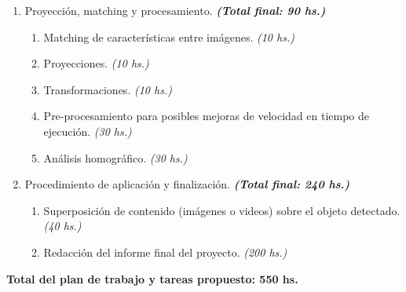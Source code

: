 \documentclass[a4paper,11pt,spanish]{article}
\begin{document}
\begin{enumerate}
	\item Proyección, matching y procesamiento. \textbf{\textit{(Total final: 90 hs.)}}
	  \begin {enumerate} 
	    \item Matching de características entre imágenes. \textit{(10 hs.)}
	    \item Proyecciones. \textit{(10 hs.)}
	    \item Transformaciones. \textit{(10 hs.)}
	    \item Pre-procesamiento para posibles mejoras de velocidad en tiempo de ejecución. \textit{(30 hs.)} %
	    \item Análisis homográfico. \textit{(30 hs.)}
	  \end{enumerate}
	

	
	
	
	
	\item Procedimiento de aplicación y finalización. \textbf{\textit{(Total final: 240 hs.)}}
	  \begin{enumerate}
	    \item Superposición de contenido (imágenes o videos) sobre el objeto detectado. \textit{(40 hs.)}
	    \item Redacción del informe final del proyecto. \textit{(200 hs.)}
	  \end{enumerate}
\end{enumerate}
\textbf{Total del plan de trabajo y tareas propuesto: 550 hs.}
\end{document}
